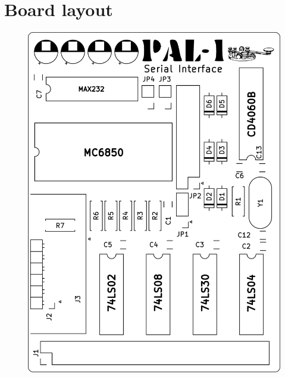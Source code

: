 \documentclass[a4paper,11pt,twoside,openright]{report}
\begin{document}


\chapter{Board layout}
\begin{figure}[h!]
\centering
\includegraphics[scale=0.65]{figures/serial-brd-1.0a.png}
\end{figure}





\end{document}
